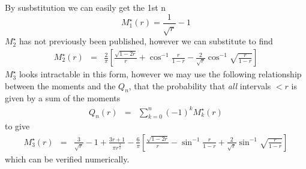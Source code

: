 \documentclass{article}
\begin{document}
By susbstitution we can easily get the 1st n
\begin{equation}
  M^\star_1(r) = \frac{1}{\sqrt{r}} - 1
\end{equation}
$M^\star_2$ has not previously been published, however we can substitute to find
\begin{eqnarray}
  M^\star_2(r) &=& \frac{2}{\pi}\left[\frac{\sqrt{1-2r}}{r} + \cos^{-1}\frac{r}{1-r}-\frac{2}{\sqrt{r}} \cos^{-1} \sqrt{\frac{r}{1-r}}\right] \nonumber
\end{eqnarray}
$M^\star_3$ looks intractable in this form, however we may use the following relationship between the moments and the $Q_n$, that the probability that \emph{all} intervals $<r$ is given by a sum of the moments
\begin{eqnarray}
  Q_n(r) &=& \sum_{k=0}^n (-1)^k M^\star_k(r) 
\end{eqnarray}
to give
\begin{eqnarray}
  M^\star_3(r) &=& \frac{3}{\sqrt{r}} - 1 + \frac{3r+1}{\pi r^{\frac{3}{2}}} - \frac{6}{\pi}\left[\frac{\sqrt{1-2r}}{r} - \sin^{-1}\frac{r}{1-r}  +\frac{2}{\sqrt{r}} \sin^{-1}\sqrt{\frac{r}{1-r}}\right] \nonumber
\end{eqnarray}
which can be verified numerically.
\end{document}
